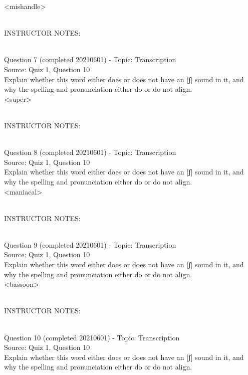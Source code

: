 \documentclass[12pt]{article}
\begin{document}
<mishandle>


~\\
INSTRUCTOR NOTES: 


~\\

{\large Question 7} (completed 20210601) - Topic: Transcription\\
Source: Quiz 1, Question 10\\

Explain whether this word either does or does not have an [ʃ] sound in it, and why the spelling and pronunciation either do or do not align.\\

<super>


~\\
INSTRUCTOR NOTES: 


~\\

{\large Question 8} (completed 20210601) - Topic: Transcription\\
Source: Quiz 1, Question 10\\

Explain whether this word either does or does not have an [ʃ] sound in it, and why the spelling and pronunciation either do or do not align.\\

<maniacal>


~\\
INSTRUCTOR NOTES: 


~\\

{\large Question 9} (completed 20210601) - Topic: Transcription\\
Source: Quiz 1, Question 10\\

Explain whether this word either does or does not have an [ʃ] sound in it, and why the spelling and pronunciation either do or do not align.\\

<bassoon>


~\\
INSTRUCTOR NOTES: 


~\\

{\large Question 10} (completed 20210601) - Topic: Transcription\\
Source: Quiz 1, Question 10\\

Explain whether this word either does or does not have an [ʃ] sound in it, and why the spelling and pronunciation either do or do not align.\\
\end{document}
